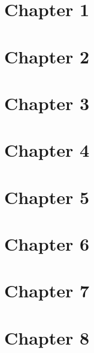 \documentclass[11pt,fleqn]{book} %
\begin{document}



%
\part{Chapter 1}

\part{Chapter 2}


\part{Chapter 3}


\part{Chapter 4}


\part{Chapter 5}


\part{Chapter 6}


\part{Chapter 7}


\part{Chapter 8}


\end{document}
